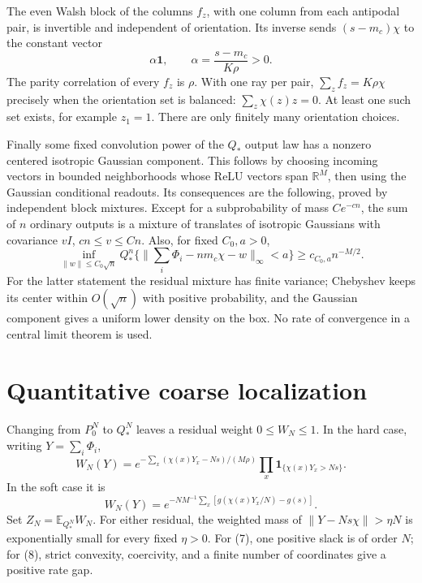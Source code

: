 \documentclass[11pt]{article}
\newcommand{\E}{\mathbb E}\newcommand{\Pp}{\mathbb P}
\newcommand{\R}{\mathbb R}\newcommand{\one}{\mathbf1}
\begin{document}
The even Walsh block of the columns $f_z$, with one column from each
antipodal pair, is invertible and independent of orientation. Its inverse
sends $(s-m_c)\chi$ to the constant vector
\[
                         \alpha\mathbf1,
             \qquad \alpha=\frac{s-m_c}{K\rho}>0.        \tag{5}
\]
The parity correlation of every $f_z$ is $\rho$. With one ray per pair,
$\sum_z f_z=K\rho\chi$ precisely when the orientation set is balanced:
$\sum_z\chi(z)z=0$. At least one such set exists, for example $z_1=1$.
There are only finitely many orientation choices.

Finally some fixed convolution power of the $Q_*$ output law has a
nonzero centered isotropic Gaussian component. This follows by choosing
incoming vectors in bounded neighborhoods whose ReLU vectors span
$\R^M$, then using the Gaussian conditional readouts. Its consequences
are the following, proved by independent block mixtures. Except for a
subprobability of mass $Ce^{-cn}$, the sum of $n$ ordinary outputs is a
mixture of translates of isotropic Gaussians with covariance $vI$,
$cn\le v\le Cn$. Also, for fixed $C_0,a>0$,
\[
 \inf_{\|w\|\le C_0\sqrt n}
 Q_*^n\{\|\textstyle\sum_i\Phi_i-nm_c\chi-w\|_\infty<a\}
                      \ge c_{C_0,a}n^{-M/2}.             \tag{6}
\]
For the latter statement the residual mixture has finite variance;
Chebyshev keeps its center within $O(\sqrt n)$ with positive probability,
and the Gaussian component gives a uniform lower density on the box.
No rate of convergence in a central limit theorem is used.

\section{Quantitative coarse localization}
Changing from $P_0^N$ to $Q_*^N$ leaves a residual weight $0\le W_N\le1$.
In the hard case, writing $Y=\sum_i\Phi_i$,
\[
 W_N(Y)=e^{-\sum_x(\chi(x)Y_x-Ns)/(M\rho)}
                  \prod_x\one_{\{\chi(x)Y_x>Ns\}}.       \tag{7}
\]
In the soft case it is
\[
 W_N(Y)=e^{-N M^{-1}\sum_x[g(\chi(x)Y_x/N)-g(s)]}.        \tag{8}
\]
Set $Z_N=\E_{Q_*^N}W_N$. For either residual, the weighted mass of
$\|Y-Ns\chi\|>\eta N$ is exponentially small for every fixed $\eta>0$.
For (7), one positive slack is of order $N$; for (8), strict convexity,
coercivity, and a finite number of coordinates give a positive rate gap.
\end{document}
